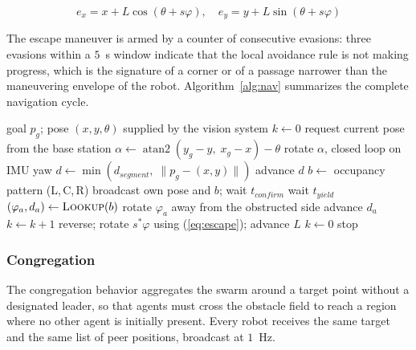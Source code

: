\documentclass[conference]{IEEEtran}
\begin{document}
\begin{equation}
e_x = x + L\cos(\theta + s\varphi), \quad
e_y = y + L\sin(\theta + s\varphi)
\label{eq:escape_proj}
\end{equation}

The escape maneuver is armed by a counter of consecutive evasions: three
evasions within a $5$~s window indicate that the local avoidance rule is not
making progress, which is the signature of a corner or of a passage narrower
than the maneuvering envelope of the robot. Algorithm~\ref{alg:nav}
summarizes the complete navigation cycle.

\begin{algorithm}
\caption{Goal-directed navigation with obstacle avoidance}
\label{alg:nav}
\begin{algorithmic}[1]
\REQUIRE goal $p_g$; pose $(x,y,\theta)$ supplied by the vision system
\STATE $k \leftarrow 0$ 
    \STATE request current pose from the base station
    \STATE $\alpha \leftarrow \operatorname{atan2}(y_g - y,\; x_g - x) - \theta$
        \STATE rotate $\alpha$, closed loop on IMU yaw
    \ENDIF
    \STATE $d \leftarrow \min \left( d_{segment},\; \lVert p_g - (x,y) \rVert \right)$
    \STATE advance $d$
        \STATE $b \leftarrow$ occupancy pattern (L,\,C,\,R)
        \STATE broadcast own pose and $b$; wait $t_{confirm}$
            \STATE wait $t_{yield}$ 
        \ELSE
            \STATE $(\varphi_a, d_a) \leftarrow \textsc{Lookup}(b)$
            \STATE rotate $\varphi_a$ away from the obstructed side
            \STATE advance $d_a$
            \STATE $k \leftarrow k + 1$
        \ENDIF
            \STATE reverse; rotate $s^{*}\varphi$ using (\ref{eq:escape});
                   advance $L$
            \STATE $k \leftarrow 0$
        \ENDIF
    \ENDIF
\ENDWHILE
\STATE stop
\end{algorithmic}
\end{algorithm}

\subsubsection{Congregation}
The congregation behavior aggregates the swarm around a target point without a
designated leader, so that agents must cross the obstacle field to reach a
region where no other agent is initially present. Every robot receives the same
target and the same list of peer positions, broadcast at $1$~Hz.
\end{document}
